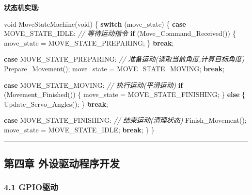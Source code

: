 \documentclass[
]{article}
\newenvironment{Shaded}{}{}
\newcommand{\CommentTok}[1]{\textcolor[rgb]{0.38,0.63,0.69}{\textit{#1}}}
\newcommand{\ControlFlowTok}[1]{\textcolor[rgb]{0.00,0.44,0.13}{\textbf{#1}}}
\newcommand{\DataTypeTok}[1]{\textcolor[rgb]{0.56,0.13,0.00}{#1}}
\newcommand{\NormalTok}[1]{#1}
\begin{document}
\textbf{状态机实现}:

\begin{Shaded}
\begin{Highlighting}[]
\DataTypeTok{void}\NormalTok{ MoveStateMachine(}\DataTypeTok{void}\NormalTok{)}
\NormalTok{\{}
    \ControlFlowTok{switch}\NormalTok{ (move\_state) \{}
        \ControlFlowTok{case}\NormalTok{ MOVE\_STATE\_IDLE:}
            \CommentTok{// 等待运动指令}
            \ControlFlowTok{if}\NormalTok{ (Move\_Command\_Received()) \{}
\NormalTok{                move\_state = MOVE\_STATE\_PREPARING;}
\NormalTok{            \}}
            \ControlFlowTok{break}\NormalTok{;}
            
        \ControlFlowTok{case}\NormalTok{ MOVE\_STATE\_PREPARING:}
            \CommentTok{// 准备运动(读取当前角度,计算目标角度)}
\NormalTok{            Prepare\_Movement();}
\NormalTok{            move\_state = MOVE\_STATE\_MOVING;}
            \ControlFlowTok{break}\NormalTok{;}
            
        \ControlFlowTok{case}\NormalTok{ MOVE\_STATE\_MOVING:}
            \CommentTok{// 执行运动(平滑运动)}
            \ControlFlowTok{if}\NormalTok{ (Movement\_Finished()) \{}
\NormalTok{                move\_state = MOVE\_STATE\_FINISHING;}
\NormalTok{            \} }\ControlFlowTok{else}\NormalTok{ \{}
\NormalTok{                Update\_Servo\_Angles();}
\NormalTok{            \}}
            \ControlFlowTok{break}\NormalTok{;}
            
        \ControlFlowTok{case}\NormalTok{ MOVE\_STATE\_FINISHING:}
            \CommentTok{// 结束运动(清理状态)}
\NormalTok{            Finish\_Movement();}
\NormalTok{            move\_state = MOVE\_STATE\_IDLE;}
            \ControlFlowTok{break}\NormalTok{;}
\NormalTok{    \}}
\NormalTok{\}}
\end{Highlighting}
\end{Shaded}

\begin{center}\rule{0.5\linewidth}{0.5pt}\end{center}

\hypertarget{ux7b2cux56dbux7ae0-ux5916ux8bbeux9a71ux52a8ux7a0bux5e8fux5f00ux53d1}{%
\subsection{第四章
外设驱动程序开发}\label{ux7b2cux56dbux7ae0-ux5916ux8bbeux9a71ux52a8ux7a0bux5e8fux5f00ux53d1}}

\hypertarget{gpioux9a71ux52a8}{%
\subsubsection{4.1 GPIO驱动}\label{gpioux9a71ux52a8}}
\end{document}
